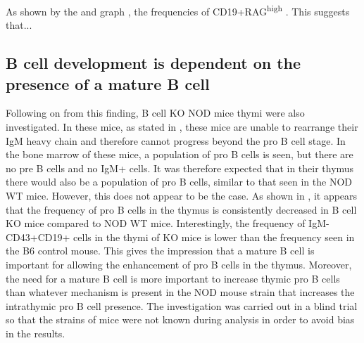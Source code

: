As shown by the  and graph , the frequencies of CD19+RAG\textsuperscript{high} . This suggests that... 








\subsection{B cell development is dependent on the presence of a mature B cell}

Following on from this finding, B cell KO NOD mice thymi were also investigated.
In these mice, as stated in , these mice are unable to rearrange their IgM heavy chain and therefore cannot progress beyond the pro B cell stage. 
In the bone marrow of these mice, a population of pro B cells is seen, but there are no pre B cells and no IgM+ cells.
It was therefore expected that in their thymus there would also be a population of pro B cells, similar to that seen in the NOD WT mice. 
However, this does not appear to be the case.
As shown in , it appears that the frequency of pro B cells in the thymus is consistently decreased in B cell KO mice compared to NOD WT mice.
Interestingly, the frequency of IgM-CD43+CD19+ cells in the thymi of KO mice is lower than the frequency seen in the B6 control mouse. 
This gives the impression that a mature B cell is important for allowing the enhancement of pro B cells in the thymus.
Moreover, the need for a mature B cell is more important to increase thymic pro B cells than whatever mechanism is present in the NOD mouse strain that increases the intrathymic pro B cell presence.
The investigation was carried out in a blind trial so that the strains of mice were not known during analysis in order to avoid bias in the results.




